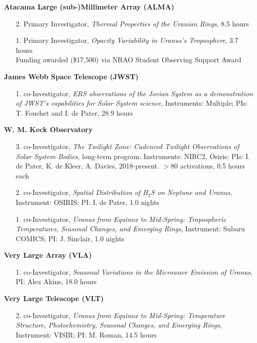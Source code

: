 \documentclass[margin, 10pt]{res} %
\begin{document}
\begin{resume}
\textbf{Atacama Large (sub-)Millimeter Array (ALMA)} 
\begin{enumerate}
	\item[2.] Primary Investigator, {\it Thermal Properties of the Uranian Rings}, 8.5 hours %
	\item[1.] Primary Investigator, {\it Opacity Variability in Uranus's Troposphere}, 3.7 hours \\ Funding awarded (\$17,500) via NRAO Student Observing Support Award %
\end{enumerate}
\vspace{-0.3cm}
\textbf{James Webb Space Telescope (JWST)} 
\begin{enumerate}
	\item[1.] co-Investigator, {\it ERS observations of the Jovian System as a demonstration of JWST's capabilities for Solar System science}, Instruments: Multiple; PIs: T. Fouchet and I. de Pater, 28.9 hours %
\end{enumerate}
\vspace{-0.3cm}
\textbf{W. M. Keck Observatory} 
\begin{enumerate}
	\item[3.] co-Investigator, {\it The Twilight Zone: Cadenced Twilight Observations of Solar System Bodies}, long-term program. Instruments: NIRC2, Osiris; PIs: I. de Pater, K. de Kleer, A. Davies, 2018-present. $>$80 activations, 0.5 hours each %
	\item[2.] co-Investigator, {\it Spatial Distribution of H$_2$S on Neptune and Uranus}, Instrument: OSIRIS; PI: I. de Pater, 1.0 nights %
	\item[1.] co-Investigator, {\it Uranus from Equinox to Mid-Spring: Tropospheric Temperatures, Seasonal Changes, and Emerging Rings}, Instrument: Subaru COMICS; PI: J. Sinclair, 1.0 nights %
\end{enumerate}
\vspace{-0.3cm}
\textbf{Very Large Array (VLA)}
\begin{enumerate}
	\item[1.] co-Investigator, {\it Seasonal Variations in the Microwave Emission of Uranus}, PI: Alex Akins, 18.0 hours %
\end{enumerate}
\vspace{-0.3cm}
\textbf{Very Large Telescope (VLT)} 
\begin{enumerate}
	\item[2.] co-Investigator, {\it Uranus from Equinox to Mid-Spring: Temperature Structure, Photochemistry, Seasonal Changes, and Emerging Rings}, Instrument: VISIR; PI: M. Roman, 14.5 hours %

\end{enumerate}
\end{resume}
\end{document}
